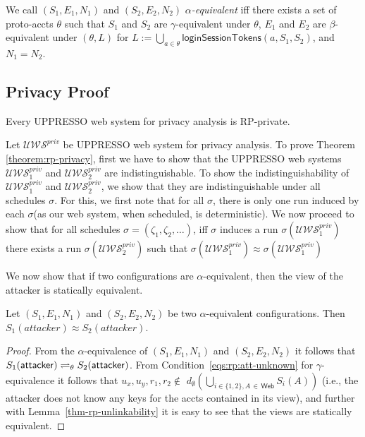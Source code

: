 \begin{theorem}
  \begin{definition}
    We call $(S_1,E_1,N_1)$ and $(S_2,E_2,N_2)$
    \emph{$\alpha$-equivalent} iff there exists a set of 
    proto-accts $\theta$ such that $S_1$ and $S_2$ are
    $\gamma$-equivalent under $\theta$, $E_1$ and $E_2$ are
    $\beta$-equivalent under $(\theta,L)$ 
    for $L := \bigcup_{a\in\theta} \mathsf{loginSessionTokens}(a,S_1,S_2)$, 
    and $N_1 = N_2$.
  \end{definition}
  
  \subsection{Privacy Proof}
  
  \begin{theorem} \label{theorem:rp-privacy}
    Every UPPRESSO web system for privacy analysis is RP-private.
  \end{theorem}
  
  Let $\mathcal{U\!W\!S}^{priv}$ be UPPRESSO web system for privacy analysis.
  To prove Theorem \ref{theorem:rp-privacy}, first we have to show that 
  the UPPRESSO web systems $\mathcal{U\!W\!S}^{priv}_1$ and 
  $\mathcal{U\!W\!S}^{priv}_2$ are indistinguishable. To show 
  the indistinguishability of $\mathcal{U\!W\!S}^{priv}_1$ and 
  $\mathcal{U\!W\!S}^{priv}_2$, we show that they are 
  indistinguishable under all schedules $\sigma$. For this, 
  we first note that for all $\sigma$, there is only one run 
  induced by each $\sigma$(as our web system, when scheduled, is deterministic).
  We now proceed to show that for all schedules $\sigma=(\zeta _1, \zeta_2,\dots)$, 
  iff $\sigma$ induces a run $\sigma(\mathcal{U\!W\!S}^{priv}_1)$ 
  there exists a run $\sigma(\mathcal{U\!W\!S}^{priv}_2)$ 
  such that $\sigma(\mathcal{U\!W\!S}^{priv}_1)\approx\sigma(\mathcal{U\!W\!S}^{priv}_1)$
  
  We now show that if two configurations are $\alpha$-equivalent, 
  then the view of the attacker is statically equivalent.
  
  \begin{lemma}\label{lemma:statically-equivalent}
    Let $(S_1,E_1,N_1)$ and $(S_2,E_2,N_2)$ be two 
    $\alpha$-equivalent configurations. 
    Then $S_1(attacker)\approx S_2(attacker)$.
  \end{lemma}
  \begin{proof}
    From the $\alpha$-equivalence of $(S_1,E_1,N_1)$ and 
    $(S_2,E_2,N_2)$ it follows that $S_1(\mathsf{attacker}) 
    \rightleftharpoons_{\theta} S_2(\mathsf{attacker})$.
    From Condition~\ref{eqs:rp:att-unknown} for 
    $\gamma$-equivalence it follows that
    $u_x, u_y, r_1, r_2 \not\in $
    $d_\emptyset(\bigcup_{i\in\{1,2\},A\,\in\,\mathsf{Web}}S_i(A))$ 
    (i.e., the attacker does not know any keys for the accts 
    contained in its view), and further with Lemma~\ref{thm-rp-unlinkability} 
    it is easy to see that the views are statically equivalent.
  \end{proof}


\end{theorem}
